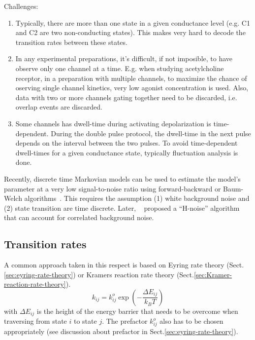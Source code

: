 Challenges:
\begin{enumerate}
  \item Typically, there are more than one state in a given conductance level (e.g. C1
and C2 are two non-conducting states). This makes very hard to decode the
transition rates between these states.

  \item In any experimental preparations, it's difficult, if not imposible, to
  have observe only one channel at a time. E.g. when studying acetylcholine
  receptor, in a preparation with multiple channels, to maximize the chance of
  oserving single channel kinetics, very low agonist concentration is used.
  Also, data with two or more channels gating together need to be discarded,
  i.e. overlap events are discarded.

  \item Some channels has dwell-time during activating depolarization is
  time-dependent. During the double pulse protocol, the dwell-time in the next
  pulse depends on the interval between the two pulses. To avoid time-dependent
  dwell-times for a given conductance state, typically fluctuation analysis is
  done.
\end{enumerate}

Recently, discrete time Markovian models can be used to estimate the model's
parameter at a very low signal-to-noise ratio using forward-backward or Baum-Welch
algorithms~\citep{colquhoun2008psi}. This requires the assumption (1)
white background noise and (2) state transition are time
discrete. Later, ~\citep{venkataramanan2002ahm} proposed a ``H-noise''
algorithm that can account for correlated background noise.

\subsection{Transition rates}
\label{sec:transition-rate-Markov}

A common approach taken in this respect is based on Eyring rate theory
(Sect.\ref{sec:eyring-rate-theory}) or Kramers reaction rate theory
(Sect.\ref{sec:Kramer-reaction-rate-theory}).
\begin{equation}
k_{ij} = k_{ij}^o \exp\left( - \frac{\Delta E_{ij}}{k_BT} \right)
\end{equation}
with $\Delta E_{ij}$ is the height of the energy barrier that needs to be
overcome when traversing from state $i$ to state $j$.
The prefactor $k^o_{ij}$ also has to be chosen appropriately (see discussion
about prefactor in Sect.\ref{sec:eyring-rate-theory}).

